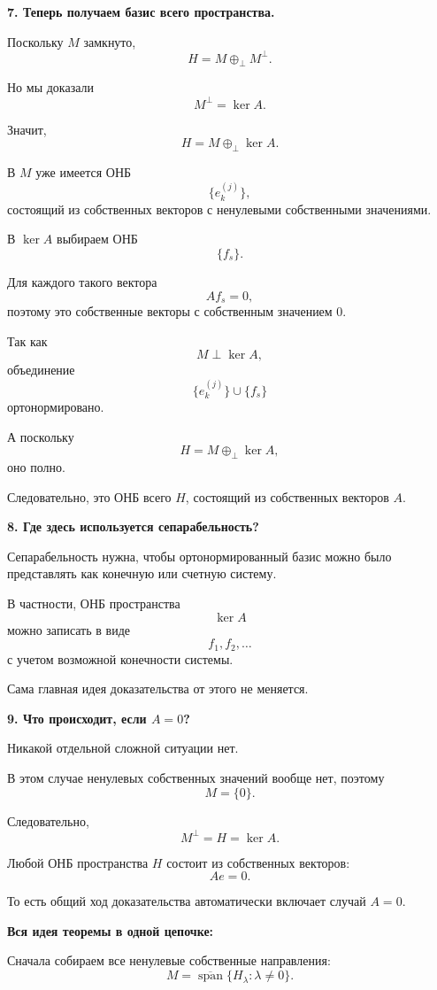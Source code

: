 \begin{idea}
	\medskip
	
	\textbf{7. Теперь получаем базис всего пространства.}
	
	Поскольку \(M\) замкнуто,
	\[
	H=M\oplus_\perp M^\perp.
	\]
	
	Но мы доказали
	\[
	M^\perp=\ker A.
	\]
	
	Значит,
	\[
	\boxed{
		H=M\oplus_\perp\ker A.
	}
	\]
	
	В \(M\) уже имеется ОНБ
	\[
	\{e_k^{(j)}\},
	\]
	состоящий из собственных векторов с ненулевыми собственными значениями.
	
	В \(\ker A\) выбираем ОНБ
	\[
	\{f_s\}.
	\]
	
	Для каждого такого вектора
	\[
	Af_s=0,
	\]
	поэтому это собственные векторы с собственным значением \(0\).
	
	Так как
	\[
	M\perp\ker A,
	\]
	объединение
	\[
	\{e_k^{(j)}\}\cup\{f_s\}
	\]
	ортонормировано.
	
	А поскольку
	\[
	H=M\oplus_\perp\ker A,
	\]
	оно полно.
	
	Следовательно, это ОНБ всего \(H\), состоящий из собственных векторов \(A\).
	
	\medskip
	
	\textbf{8. Где здесь используется сепарабельность?}
	
	Сепарабельность нужна, чтобы ортонормированный базис можно было
	представлять как конечную или счетную систему.
	
	В частности, ОНБ пространства
	\[
	\ker A
	\]
	можно записать в виде
	\[
	f_1,f_2,\ldots
	\]
	с учетом возможной конечности системы.
	
	Сама главная идея доказательства от этого не меняется.
	
	\medskip
	
	\textbf{9. Что происходит, если \(A=0\)?}
	
	Никакой отдельной сложной ситуации нет.
	
	В этом случае ненулевых собственных значений вообще нет, поэтому
	\[
	M=\{0\}.
	\]
	
	Следовательно,
	\[
	M^\perp=H=\ker A.
	\]
	
	Любой ОНБ пространства \(H\) состоит из собственных векторов:
	\[
	Ae=0.
	\]
	
	То есть общий ход доказательства автоматически включает случай \(A=0\).
	
	\medskip
	
	\textbf{Вся идея теоремы в одной цепочке:}
	
	Сначала собираем все ненулевые собственные направления:
	\[
	M=
	\overline{\operatorname{span}}
	\{H_\lambda:\lambda\neq0\}.
	\]
	

\end{idea}
